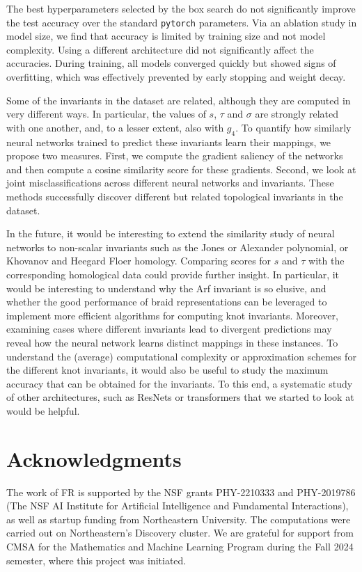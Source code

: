 \documentclass[11pt]{article}
\numberwithin{equation}{section}
\begin{document}
The best hyperparameters selected by the box search do not significantly improve the test accuracy over the standard \texttt{pytorch} parameters. Via an ablation study in model size, we find that accuracy is limited by training size and not model complexity. Using a different architecture did not significantly affect the accuracies. During training, all models converged quickly but showed signs of overfitting, which was effectively prevented by early stopping and weight decay.

Some of the invariants in the dataset are related, although they are computed in very different ways. In particular, the values of $s$, $\tau$ and $\sigma$ are strongly related with one another, and, to a lesser extent, also with $g_4$. To quantify how similarly neural networks trained to predict these invariants learn their mappings, we propose two measures. First, we compute the gradient saliency of the networks and then compute a cosine similarity score for these gradients. Second, we look at joint misclassifications across different neural networks and invariants. These methods successfully discover different but related topological invariants in the dataset. 

In the future, it would be interesting to extend the similarity study of neural networks to non-scalar invariants such as the Jones or Alexander polynomial, or Khovanov and Heegard Floer homology. Comparing scores for $s$ and $\tau$ with the corresponding homological data could provide further insight. In particular, it would be interesting to understand why the Arf invariant is so elusive, and whether the good performance of braid representations can be leveraged to implement more efficient algorithms for computing knot invariants. Moreover, examining cases where different invariants lead to divergent predictions may reveal how the neural network learns distinct mappings in these instances. To understand the (average) computational complexity or approximation schemes for the different knot invariants, it would also be useful to study the maximum accuracy that can be obtained for the invariants. To this end, a systematic study of other architectures, such as ResNets or transformers that we started to look at would be helpful.


\section*{Acknowledgments}
The work of FR is supported by the NSF grants PHY-2210333 and PHY-2019786 (The NSF AI Institute for Artificial Intelligence and Fundamental Interactions), as well as startup funding from Northeastern University. The computations were carried out on Northeastern's Discovery cluster. We are grateful for support from CMSA for the Mathematics and Machine Learning Program during the Fall 2024 semester, where this project was initiated.



\end{document}
